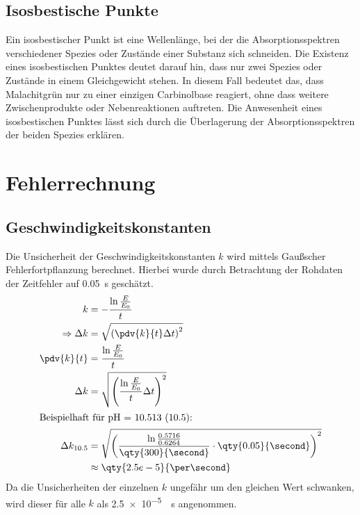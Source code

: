 \newpage
\subsection{Isosbestische Punkte}
Ein isosbestischer Punkt ist eine Wellenlänge, bei der die Absorptionsspektren verschiedener Spezies oder Zustände einer Substanz sich schneiden.
Die Existenz eines isosbestischen Punktes deutet darauf hin, dass nur zwei Spezies oder Zustände in einem Gleichgewicht stehen.
In diesem Fall bedeutet das, dass Malachitgrün nur zu einer einzigen Carbinolbase reagiert, ohne dass weitere Zwischenprodukte oder Nebenreaktionen auftreten.
Die Anwesenheit eines isosbestischen Punktes lässt sich durch die Überlagerung der Absorptionsspektren der beiden Spezies erklären.

\newpage
\printbibliography
\newpage
\appendix

\section{Fehlerrechnung}
\subsection{Geschwindigkeitskonstanten}
Die Unsicherheit der Geschwindigkeitskonstanten $k$ wird mittels Gaußscher Fehlerfortpflanzung berechnet.
Hierbei wurde durch Betrachtung der Rohdaten der Zeitfehler auf \qty{0.05}{\second} geschätzt.
\begin{align*}
    k &= - \frac{\ln \frac{E}{E_0}}{t} \\
    \Rightarrow \Delta k &= \sqrt{ \left( \pdv{k}{t} \Delta t \right)^2 } \\
    \pdv{k}{t} &= \frac{\ln \frac{E}{E_0}}{t} \\
    \Delta k &= \sqrt{ \left( \frac{\ln \frac{E}{E_0}}{t} \Delta t \right)^2 } \\
    \intertext{Beispielhaft für pH = 10.513 (10.5):}
    \Delta k_{10.5} &= \sqrt{ \left( \frac{\ln \frac{0.5716}{0.6264}}{\qty{300}{\second}} \cdot \qty{0.05}{\second} \right)^2 } \\
    &\approx \qty{2.5e-5}{\per\second}
\end{align*}
Da die Unsicherheiten der einzelnen $k$ ungefähr um den gleichen Wert schwanken, wird dieser für alle $k$ als \qty{2.5e-5}{\per\second} angenommen.

